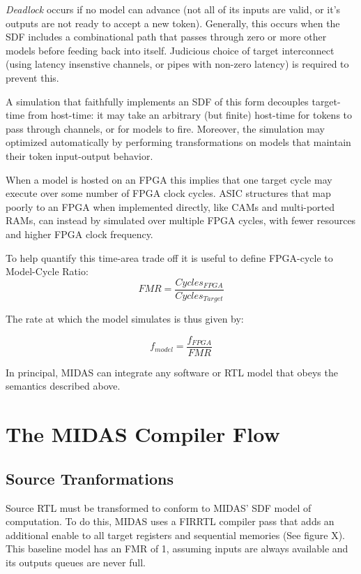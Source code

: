 \emph{Deadlock} occurs if no model can advance (not all of its inputs are
valid, or it's outputs are not ready to accept a new token). Generally, this
occurs when the SDF includes a combinational path that passes through zero
or more other models before feeding back into itself.  Judicious choice of target interconnect (using
latency insenstive channels, or pipes with non-zero latency) is required to
prevent this.

A simulation that faithfully implements an SDF of this form decouples
target-time from host-time: it may take an arbitrary (but finite) host-time for
tokens to pass through channels, or for models to fire.  Moreover, the
simulation may optimized automatically by performing transformations on models
that maintain their token input-output behavior.

When a model is hosted on an FPGA this implies that one target cycle may
execute over some number of FPGA clock cycles.  ASIC structures that map poorly
to an FPGA when implemented directly, like CAMs and multi-ported RAMs, can
instead by simulated over multiple FPGA cycles, with fewer resources and higher
FPGA clock frequency.


To help quantify this time-area trade off it is useful to define FPGA-cycle to Model-Cycle Ratio\cite{APorts}:
$$ FMR = \frac{Cycles_{FPGA}}{Cycles_{Target}} $$

\noindent The rate at which the model simulates is thus given by:

$$ f_{model} = \frac{f_{FPGA}}{FMR} $$

In principal, MIDAS can integrate any software or RTL model that obeys the semantics described above.


\section{The MIDAS Compiler Flow}


\subsection{Source Tranformations}\label{sec:source-transformations}

Source RTL must be transformed to conform to MIDAS' SDF model of computation.
To do this, MIDAS uses a FIRRTL compiler pass that adds an additional enable to
all target registers and sequential memories \TODO(See figure X). This baseline
model has an FMR of 1, assuming inputs are always available and its outputs
queues are never full.


